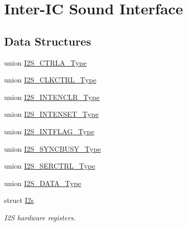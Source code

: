 \hypertarget{group___s_a_m_d21___i2_s}{}\section{Inter-\/\+IC Sound Interface}
\label{group___s_a_m_d21___i2_s}
\subsection*{Data Structures}
\begin{DoxyCompactItemize}
\item 
union \mbox{\hyperlink{union_i2_s___c_t_r_l_a___type}{I2\+S\+\_\+\+C\+T\+R\+L\+A\+\_\+\+Type}}
\item 
union \mbox{\hyperlink{union_i2_s___c_l_k_c_t_r_l___type}{I2\+S\+\_\+\+C\+L\+K\+C\+T\+R\+L\+\_\+\+Type}}
\item 
union \mbox{\hyperlink{union_i2_s___i_n_t_e_n_c_l_r___type}{I2\+S\+\_\+\+I\+N\+T\+E\+N\+C\+L\+R\+\_\+\+Type}}
\item 
union \mbox{\hyperlink{union_i2_s___i_n_t_e_n_s_e_t___type}{I2\+S\+\_\+\+I\+N\+T\+E\+N\+S\+E\+T\+\_\+\+Type}}
\item 
union \mbox{\hyperlink{union_i2_s___i_n_t_f_l_a_g___type}{I2\+S\+\_\+\+I\+N\+T\+F\+L\+A\+G\+\_\+\+Type}}
\item 
union \mbox{\hyperlink{union_i2_s___s_y_n_c_b_u_s_y___type}{I2\+S\+\_\+\+S\+Y\+N\+C\+B\+U\+S\+Y\+\_\+\+Type}}
\item 
union \mbox{\hyperlink{union_i2_s___s_e_r_c_t_r_l___type}{I2\+S\+\_\+\+S\+E\+R\+C\+T\+R\+L\+\_\+\+Type}}
\item 
union \mbox{\hyperlink{union_i2_s___d_a_t_a___type}{I2\+S\+\_\+\+D\+A\+T\+A\+\_\+\+Type}}
\item 
struct \mbox{\hyperlink{struct_i2s}{I2s}}
\begin{DoxyCompactList}\small\item\em I2S hardware registers. \end{DoxyCompactList}\end{DoxyCompactItemize}
